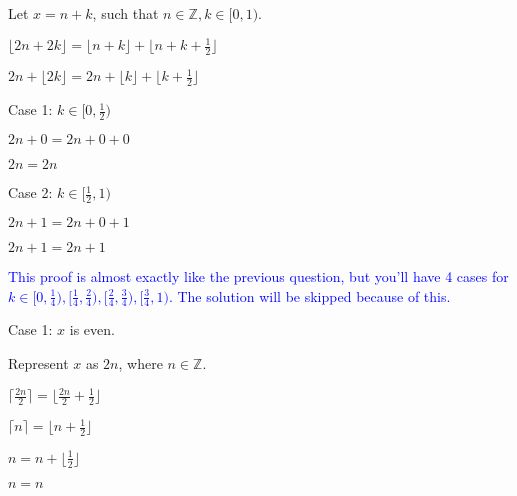 \documentclass{exam}
\begin{document}
\begin{questions}
\begin{subparts}
\begin{center}

Let \(x = n + k\), such that \(n \in \mathbb{Z}, k \in [0, 1) \).

\( \lfloor 2n + 2k \rfloor = \lfloor n + k \rfloor + \lfloor n + k + \frac{1}{2} \rfloor \)

\( 2n + \lfloor 2k \rfloor = 2n + \lfloor k \rfloor + \lfloor k + \frac{1}{2} \rfloor \)
\vspace{5px}

Case 1: \(k \in [0, \frac{1}{2}) \)

\( 2n + 0 = 2n + 0 + 0 \)

\( 2n = 2n\)
\vspace{5px}

Case 2: \(k \in [\frac{1}{2}, 1) \)

\( 2n + 1 = 2n + 0 + 1 \)

\( 2n + 1 = 2n + 1\)

\end{center}


\begin{center}

\textcolor{blue}{This proof is almost exactly like the previous question, but you'll have 4 cases for \(k \in [0, \frac{1}{4}), [\frac{1}{4}, \frac{2}{4}), [\frac{2}{4}, \frac{3}{4}), [\frac{3}{4}, 1)\). The solution will be skipped because of this.}

\end{center}

\newpage


\begin{center}

Case 1: \(x\) is even.

Represent \(x\) as \(2n\), where \(n \in \mathbb{Z}\).

\( \lceil \frac{2n}{2} \rceil = \lfloor \frac{2n}{2} + \frac{1}{2} \rfloor \)

\( \lceil n \rceil = \lfloor n + \frac{1}{2} \rfloor \)

\( n = n + \lfloor \frac{1}{2} \rfloor \)

\( n = n \)
\vspace{5px}


\end{center}
\end{subparts}
\end{questions}
\end{document}

